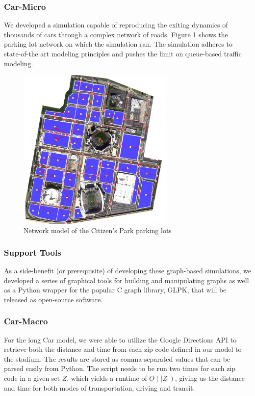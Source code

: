 \subsubsection{Car-Micro}

We developed a simulation capable of reproducing the exiting dynamics
of thousands of cars through a complex network of roads. Figure
\ref{fig-car-micro-network} shows the parking lot network on which the
simulation ran. The simulation adheres to state-of-the art modeling
principles and pushes the limit on queue-based traffic modeling.

\begin{figure}[htp]
  \centering
  \includegraphics[height=8cm]{graphics/network-flow.png}
  \caption{Network model of the Citizen's Park parking lots}
  \label{fig-car-micro-network}
\end{figure}


\subsubsection{Support Tools}
As a side-benefit (or prerequisite) of developing these graph-based
simulations, we developed a series of graphical tools for building and
manipulating graphs as well as a Python wrapper for the popular C
graph library, GLPK, that will be released as open-source software.

\subsubsection{Car-Macro}

For the long Car model, we were able to utilize the Google Directions
API to retrieve both the distance and time from each zip code defined
in our model to the stadium. The results are stored as comma-separated
values that can be parsed easily from Python. The script needs to be
run two times for each zip code in a given set $Z$, which yields a
runtime of $O(|Z|)$, giving us the distance and time for both modes of
transportation, driving and transit.

